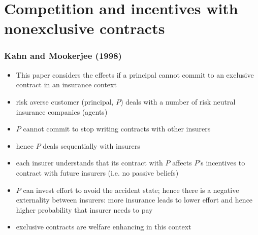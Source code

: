 \documentclass[11pt,english]{beamer}
\begin{document}
\section{Competition and incentives with nonexclusive contracts}
\label{sec-7}
\begin{frame}[allowframebreaks]\frametitle{Kahn and Mookerjee (1998)}
\label{sec-7-1}
\begin{itemize}

\item This paper considers the effects if a principal cannot commit to an exclusive contract in an insurance context\\
\label{sec-7-1-1}%
\item risk averse customer (principal, $P$) deals with a number of risk neutral insurance companies (agents)\\
\label{sec-7-1-2}%
\item $P$ cannot commit to stop writing contracts with other insurers\\
\label{sec-7-1-3}%
\item hence $P$ deals sequentially with insurers\\
\label{sec-7-1-4}%
\item each insurer understands that its contract with $P$ affects $P$'s incentives to contract with future insurers (i.e. no passive beliefs)\\
\label{sec-7-1-5}%
\item $P$ can invest effort to avoid the accident state; hence there is a negative externality between insurers: more insurance leads to lower effort and hence higher probability that insurer needs to pay\\
\label{sec-7-1-6}%
\item exclusive contracts are welfare enhancing in this context\\
\label{sec-7-1-7}%
\end{itemize} %
\end{frame}
\end{document}
